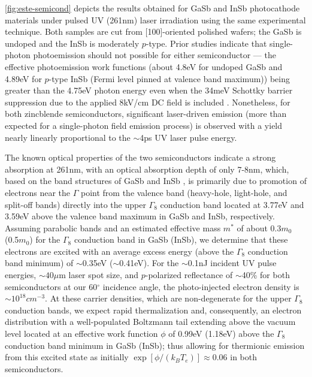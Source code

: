 \ref{fig:este-semicond} depicts the results obtained for GaSb and InSb photocathode materials under pulsed UV (261nm) laser irradiation using the same experimental technique.
Both samples are cut from [100]-oriented polished wafers; the GaSb is undoped and the InSb is moderately $p$-type.
Prior studies \cite{gobeli_photoelectric_1965} indicate that single-photon photoemission should not possible for either semiconductor --- the effective photoemission work functions (about 4.8eV for undoped GaSb and 4.89eV for $p$-type InSb (Fermi level pinned at valence band maximum)) being greater than the 4.75eV photon energy even when the 34meV Schottky barrier suppression due to the applied 8kV/cm DC field is included \cite{dowell_quantum_2009}.
Nonetheless, for both zincblende semiconductors, significant laser-driven emission (more than expected for a single-photon field emission process) is observed with a yield nearly linearly proportional to the $\sim$4ps UV laser pulse energy.

The known optical properties of the two semiconductors \cite{aspnes_dielectric_1983} indicate a strong absorption at 261nm, with an optical absorption depth of only 7-8nm, which, based on the band structures of GaSb \cite{chelikowsky_nonlocal_1976} and InSb \cite{chelikowsky_erratum_1984}, is primarily due to promotion of electrons near the $\Gamma$ point from the valence band (heavy-hole, light-hole, and split-off bands) directly into the upper $\Gamma_8$ conduction band located at 3.77eV and 3.59eV above the valence band maximum in GaSb and InSb, respectively.
Assuming parabolic bands and an estimated effective mass $m^*$ of about 0.3$m_0$ (0.5$m_0$) for the $\Gamma_8$ conduction band in GaSb (InSb), we determine that these electrons are excited with an average excess energy (above the $\Gamma_8$ conduction band minimum) of $\sim$0.35eV ($\sim$0.41eV).
For the $\sim$0.1nJ incident UV pulse energies, $\sim40\mu$m laser spot size, and $p$-polarized reflectance of $\sim$40\% for both semiconductors at our 60$^{\circ}$ incidence angle, the photo-injected electron density is $\sim10^{18}cm^{-3}$.
At these carrier densities, which are non-degenerate for the upper $\Gamma_8$ conduction bands, we expect rapid thermalization \cite{portella_k-space_1992} and, consequently, an electron distribution with a well-populated Boltzmann tail extending above the vacuum level located at an effective work function $\phi$ of 0.99eV (1.18eV) above the $\Gamma_8$ conduction band minimum in GaSb (InSb); thus allowing for thermionic emission from this excited state as initially $\exp[\phi/(k_B T_e)] \approx 0.06$ in both semiconductors.  

